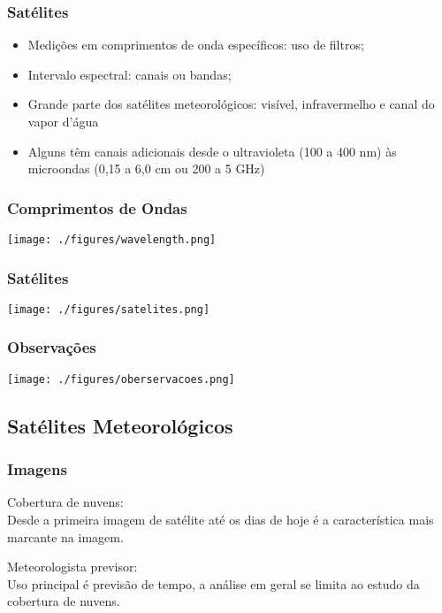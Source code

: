 \begin{frame}
\frametitle{Satélites}
  \begin{itemize}[<+-| alert@+>]
    \item Medições em comprimentos de onda específicos: uso de filtros;
    \item Intervalo espectral: canais ou bandas;
    \item Grande parte dos satélites meteorológicos: visível, infravermelho e
          canal do vapor d'água
    \item Alguns têm canais adicionais desde o ultravioleta (100 a 400 nm) às
          microondas (0,15 a 6,0 cm ou 200 a 5 GHz)
  \end{itemize}
\end{frame}


\begin{frame}
\frametitle{Comprimentos de Ondas}
  \begin{center}
    \texttt{[image: ./figures/wavelength.png]}
  \end{center}
\end{frame}


\begin{frame}
\frametitle{Satélites}
  \begin{center}
    \texttt{[image: ./figures/satelites.png]}
  \end{center}
\end{frame}

\begin{frame}
\frametitle{Observações}
  \begin{center}
    \texttt{[image: ./figures/oberservacoes.png]}
  \end{center}
\end{frame}


\subsection{Satélites Meteorológicos}
\begin{frame}
\frametitle{Imagens}
  \begin{block}{}
  Cobertura de nuvens:\\
  Desde a primeira imagem de satélite até os dias de hoje é a característica
  mais marcante na imagem.
  \end{block}
  \pause
  \begin{block}{}
    Meteorologista previsor:\\
    Uso principal é previsão de tempo, a análise em geral se limita ao estudo
    da cobertura de nuvens.
  \end{block}
\end{frame}


